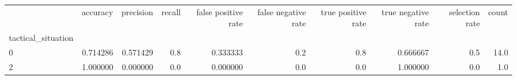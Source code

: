 \begin{tabular}{lrrrrrrrrr}
\toprule
{} &  accuracy &  precision &  recall &  false positive rate &  false negative rate &  true positive rate &  true negative rate &  selection rate &  count \\
tactical\_situation &           &            &         &                      &                      &                     &                     &                 &        \\
\midrule
0                  &  0.714286 &   0.571429 &     0.8 &             0.333333 &                  0.2 &                 0.8 &            0.666667 &             0.5 &   14.0 \\
2                  &  1.000000 &   0.000000 &     0.0 &             0.000000 &                  0.0 &                 0.0 &            1.000000 &             0.0 &    1.0 \\
\bottomrule
\end{tabular}
